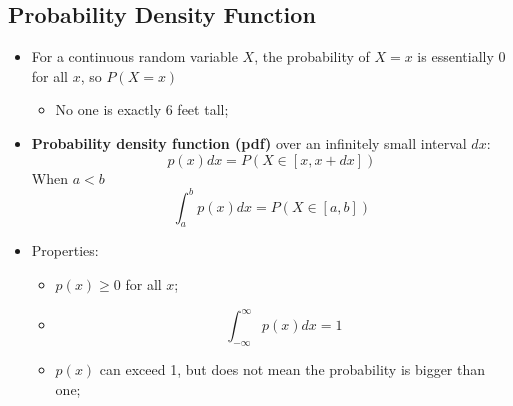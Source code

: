   \subsection{Probability Density Function}
  
    \begin{itemize}
      \item For a continuous random variable $ X $, the probability of $ X = x $ is essentially $ 0 $ for all $ x $, so $ P(X = x) $
      \begin{itemize}
        \item No one is exactly 6 feet tall;
      \end{itemize}
      
      \item \textbf{Probability density function (pdf)} over an infinitely small interval $ dx $:
      \begin{equation}
        p (x) dx = P \left( X \in \left[ x, x + dx \right] \right)
      \end{equation}
      When $ a < b $
      \begin{equation}
        \int_{a}^{b} p(x) dx = P \left( X \in \left[ a, b \right] \right)
      \end{equation}
      
      \item Properties:
      \begin{itemize}
        \item $ p(x) \ge 0 $ for all $ x $;
        \item %
        \begin{displaymath}
          \int_{- \infty}^{\infty} p(x) dx = 1
        \end{displaymath}
        
        \item $ p(x) $ can exceed 1, but does not mean the probability is bigger than one;
      \end{itemize}
    \end{itemize}